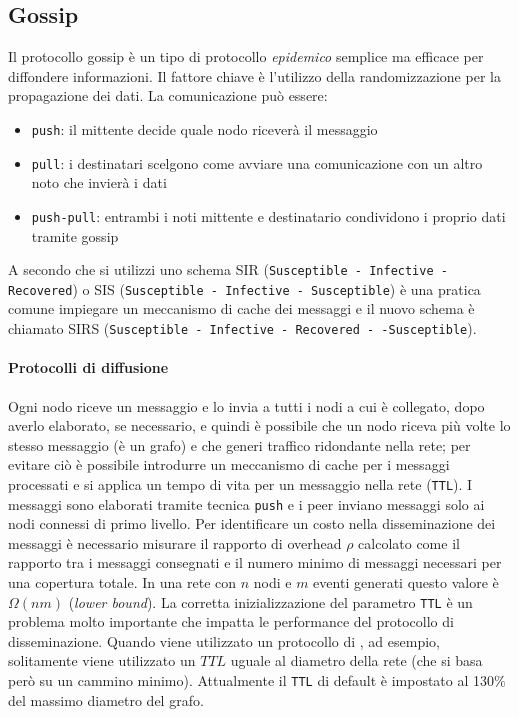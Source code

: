 \begin{appendices}
    \chapter{Gossip}
    Il protocollo gossip è un tipo di protocollo \textit{epidemico} semplice ma efficace per diffondere informazioni. Il fattore chiave è l'utilizzo della randomizzazione per la propagazione dei dati.\newline
    La comunicazione può essere:
    \begin{itemize}
        \item \texttt{push}: il mittente decide quale nodo riceverà il messaggio
        \item \texttt{pull}: i destinatari scelgono come avviare una comunicazione con un altro noto che invierà i dati
        \item \texttt{push-pull}: entrambi i noti mittente e destinatario condividono i proprio dati tramite gossip
    \end{itemize}
    A secondo che si utilizzi uno schema SIR (\texttt{Susceptible - Infective - Recovered}) o SIS (\texttt{Susceptible - Infective - Susceptible}) è una pratica comune impiegare un meccanismo di cache dei messaggi e il nuovo schema è chiamato SIRS (\texttt{Susceptible - Infective - Recovered - -Susceptible}).
    
    \subsubsection{Protocolli di diffusione}
    Ogni nodo riceve un messaggio e lo invia a tutti i nodi a cui è collegato, dopo averlo elaborato, se necessario, e quindi è possibile che un nodo riceva più volte lo stesso messaggio (è un grafo) e che generi traffico ridondante nella rete; per evitare ciò è possibile introdurre un meccanismo di cache per i messaggi processati e si applica un tempo di vita per un messaggio nella rete (\texttt{TTL}).\newline
    I messaggi sono elaborati tramite tecnica \texttt{push} e i peer inviano messaggi solo ai nodi connessi di primo livello.\newline
    Per identificare un costo nella disseminazione dei messaggi è necessario misurare il rapporto di overhead $ρ$ calcolato come il rapporto tra i messaggi consegnati e il numero minimo di messaggi necessari per una copertura totale. In una rete con $n$ nodi e $m$ eventi generati questo valore è $\Omega(nm)$ (\textit{lower bound}).\newline
    La corretta inizializzazione del parametro \texttt{TTL} è un problema molto importante che impatta le performance del protocollo di disseminazione. Quando viene utilizzato un protocollo di , ad esempio, solitamente viene utilizzato un $TTL$ uguale al diametro della rete (che si basa però su un cammino minimo). Attualmente il \texttt{TTL} di default è impostato al 130\% del massimo diametro del grafo.
    

\end{appendices}
